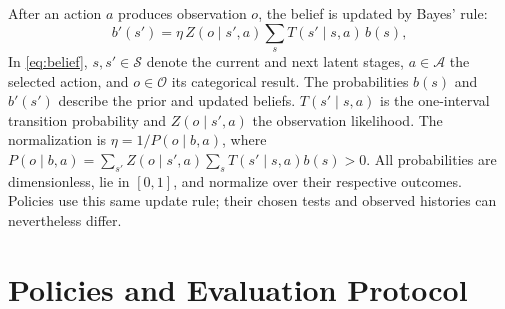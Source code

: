 \documentclass[conference,a4paper]{IEEEtran}
\begin{document}
After an action $a$ produces observation $o$, the belief is updated by
Bayes' rule:
\begin{equation}
b'(s') = \eta\, Z(o \mid s', a)\sum_s T(s' \mid s, a)\, b(s),
\label{eq:belief}
\end{equation}
In \eqref{eq:belief}, $s,s'\in\mathcal{S}$ denote the current and
next latent stages, $a\in\mathcal{A}$ the selected action, and
$o\in\mathcal{O}$ its categorical result. The probabilities $b(s)$
and $b'(s')$ describe the prior and updated beliefs.
$T(s'\mid s,a)$ is the one-interval transition probability and
$Z(o\mid s',a)$ the observation likelihood. The normalization is
$\eta=1/P(o\mid b,a)$, where
$P(o\mid b,a)=\sum_{s'}Z(o\mid s',a)\sum_sT(s'\mid s,a)b(s)>0$.
All probabilities are dimensionless, lie in $[0,1]$, and normalize
over their respective outcomes. Policies use this same update rule;
their chosen tests and observed histories can nevertheless differ.

\section{Policies and Evaluation Protocol}
\end{document}

